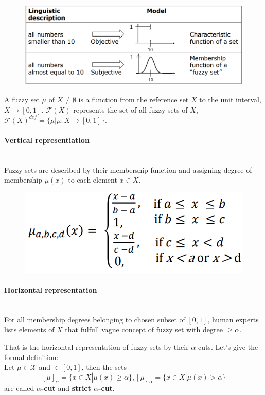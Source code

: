 \documentclass{article}
\begin{document}
\begin{figure}[H]
    \centering
    \includegraphics[scale=0.3]{images/ext_fuzzy-set.png}
\end{figure}
A fuzzy set $\mu$ of $X\neq\emptyset$ is a function from the reference set $X$
to the unit interval, $X\rightarrow[0,1]$. $\mathcal{F}(X)$ represents the set of all fuzzy sets
of $X$, $\mathcal{F}(X)^{def}=\{\mu|\mu:X\rightarrow[0,1]\}$.
\paragraph{Vertical representiation}\mbox{}\\
Fuzzy sets are described by their membership function and assigning degree of membership $\mu(x)$
to each element $x\in X$.
\begin{figure}[H]
    \centering
    \includegraphics[scale=0.5]{images/verti-repr.png}
\end{figure}

\paragraph{Horizontal representation}\mbox{}\\
For all membership degrees belonging to chosen subset of $[0,1]$, human experts lists elements
of $X$ that fulfull vague concept of fuzzy set with degree $\geq\alpha$.

That is the horizontal representation of fuzzy sets by their $\alpha$-cuts. Let's give the
formal definition:\newline\\ Let $\mu\in\mathcal{X}$ and $\in[0,1]$, then the sets
$$[\mu]_\alpha =\{x\in X|\mu(x) \geq\alpha\},[\mu]_\alpha=\{x\in X|\mu(x)>\alpha\}$$
are called \textbf{$\alpha$-cut} and \textbf{strict $\alpha$-cut}.
\end{document}

